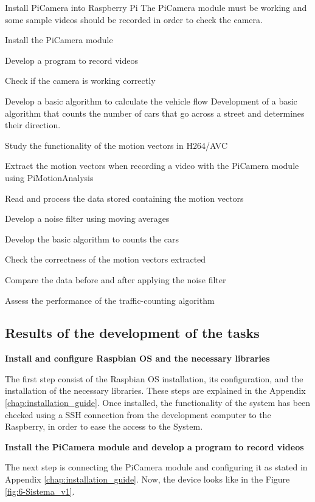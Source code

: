 {Install PiCamera into Raspberry Pi}
{The PiCamera module must be working and some sample videos should be recorded in order to check the camera.}
{	\item Install the PiCamera module
	\item Develop a program to record videos
}{	\item Check if the camera is working correctly
}

{Develop a basic algorithm to calculate the vehicle flow}
{Development of a basic algorithm that counts the number of cars that go across a street and determines their direction.}
{	\item Study the functionality of the motion vectors in H264/AVC
	\item Extract the motion vectors when recording a video with the PiCamera module using PiMotionAnalysis
	\item Read and process the data stored containing the motion vectors
	\item Develop a noise filter using moving averages
	\item Develop the basic algorithm to counts the cars
}{	\item Check the correctness of the motion vectors extracted
	\item Compare the data before and after applying the noise filter
	\item Assess the performance of the traffic-counting algorithm
}


\subsection{Results of the development of the tasks}
\textbf{Install and configure Raspbian \ac{OS} and the necessary libraries}

The first step consist of the Raspbian \ac{OS} installation, its configuration, and the installation of the necessary libraries. These steps are explained in the Appendix \ref{chap:installation_guide}. Once installed, the functionality of the system has been checked using a SSH connection from the development computer to the Raspberry, in order to ease the access to the System. 

\textbf{Install the PiCamera module and develop a program to record videos}

The next step is connecting the PiCamera module and configuring it as stated in Appendix \ref{chap:installation_guide}. Now, the device looks like in the Figure \ref{fig:6-Sistema_v1}. 

